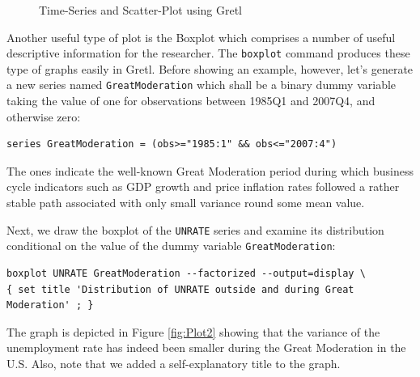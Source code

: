 \documentclass[11pt]{article}
\begin{document}
\begin{figure}[h!]
	\centering

	\caption{Time-Series and Scatter-Plot using Gretl}
	\label{fig:Plot1}
\end{figure}

Another useful type of plot is the Boxplot which comprises a number of useful descriptive information for the researcher. The \texttt{boxplot} command produces these type of graphs easily in Gretl. Before showing an example, however, let's generate a new series named \texttt{GreatModeration} which shall be a binary dummy variable taking the value of one for observations between 1985Q1 and 2007Q4, and otherwise zero:
\begin{verbatim}
series GreatModeration = (obs>="1985:1" && obs<="2007:4")
\end{verbatim}
The ones indicate the well-known Great Moderation period during which business cycle indicators such as GDP growth and price inflation rates followed a rather stable path associated with only small variance round some mean value.

Next, we draw the boxplot of the \texttt{UNRATE} series and examine its distribution conditional on the value of the dummy variable \texttt{GreatModeration}:
\begin{Verbatim}[baselinestretch=0.75]
boxplot UNRATE GreatModeration --factorized --output=display \
{ set title 'Distribution of UNRATE outside and during Great Moderation' ; }
\end{Verbatim}
The graph is depicted in Figure \ref{fig:Plot2} showing that the variance of the unemployment rate has indeed been smaller during the Great Moderation in the U.S. Also, note that we added a self-explanatory title to the graph.
\end{document}
